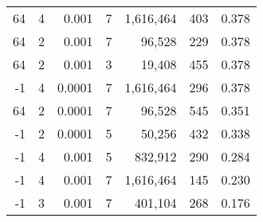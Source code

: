 \begin{tabular}{rrrrrrr}
64 & 4 & 0.001 & 7 & 1,616,464 & 403 & 0.378 \\
64 & 2 & 0.001 & 7 & 96,528 & 229 & 0.378 \\
64 & 2 & 0.001 & 3 & 19,408 & 455 & 0.378 \\
-1 & 4 & 0.0001 & 7 & 1,616,464 & 296 & 0.378 \\
64 & 2 & 0.0001 & 7 & 96,528 & 545 & 0.351 \\
-1 & 2 & 0.0001 & 5 & 50,256 & 432 & 0.338 \\
-1 & 4 & 0.001 & 5 & 832,912 & 290 & 0.284 \\
-1 & 4 & 0.001 & 7 & 1,616,464 & 145 & 0.230 \\
-1 & 3 & 0.001 & 7 & 401,104 & 268 & 0.176 \\
\bottomrule
\end{tabular}
